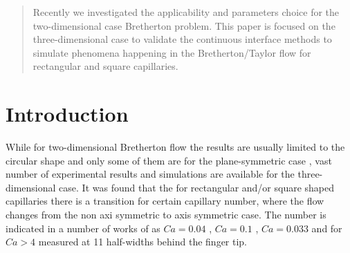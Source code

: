 \documentclass{article}
\begin{document}
\begin{abstract}
Recently we investigated the applicability and parameters choice for the two-dimensional case
Bretherton problem. This paper is focused on the three-dimensional case to validate the continuous
interface methods to simulate phenomena happening in the Bretherton/Taylor flow for rectangular
and square capillaries. 
\end{abstract}
\section{Introduction}
While for two-dimensional Bretherton flow the results are usually limited to the circular shape and
only some of them are for the plane-symmetric case \cite{giavedoni-numerical,heil-bretherton},
vast number of experimental results and simulations are available for the three-dimensional case.
It was found that the for rectangular and/or square shaped capillaries there is a transition for
certain capillary number, where the flow changes from the non axi symmetric to axis symmetric case.
The number is indicated in a number of works of as $Ca=0.04$ \cite{cerro-bubble-train}, $Ca=0.1$
\cite{cerro-space}, $Ca=0.033$ and for $Ca>4$ \cite{heil-threedim} measured at 11 half-widths behind
the finger tip. 
\end{document}
